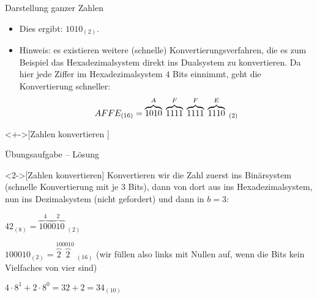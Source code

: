 \begin{frame}[fragile]{Darstellung ganzer Zahlen}
\begin{itemize}[<+(1)->]
    \item Dies ergibt: \(1010_{(2)}\).
    \item Hinweis: es existieren weitere (schnelle) Konvertierungsverfahren,\pause{} die es zum Beispiel das Hexadezimalsystem direkt ins Dualsystem zu konvertieren.\pause{} Da hier jede Ziffer im Hexadezimalsystem \(4\) Bits einnimmt, geht die Konvertierung schneller:\pause{} \[
        AFFE_{(16)} = \overbrace{1010}^{A}\;\overbrace{1111}^{F}\;\overbrace{1111}^{F}\;\overbrace{1110}^{E}\;{}_{(2)}\vspace*{-0.4cm}
    \]
\end{itemize}
\ifull{}%
\begin{exercise}<+->[Zahlen konvertieren ]
\end{exercise}\fi
\end{frame}

\ifull
\begin{frame}[c]{Übungsaufgabe -- Lösung}
\begin{solve}<2->[Zahlen konvertieren]
    \pause{}Konvertieren wir die Zahl zuerst ins Binärsystem (schnelle Konvertierung mit je \(3\) Bits),\pause{} dann von dort aus ins Hexadezimalsystem,\pause{} nun ins Dezimalsystem (nicht gefordert) und dann in \(b = 3\):\pause{} \begin{description}[b = 16]
        \item[b = 2] \(42_{(8)} = \overbrace{100}^{4}\overbrace{010}^{2}\;{}_{(2)}\)
        \item[b = 16] \(100010_{(2)} = \overbrace{2}^{10}\overbrace{2}^{0010}\;{}_{(16)}\) (wir füllen also links mit Nullen auf, wenn die Bits kein Vielfaches von vier sind)
        \item[b = 10] \(4 \cdot 8^1 + 2 \cdot 8^0 = 32 + 2 = 34_{(10)}\)
    \end{description}
\end{solve}
\end{frame}


